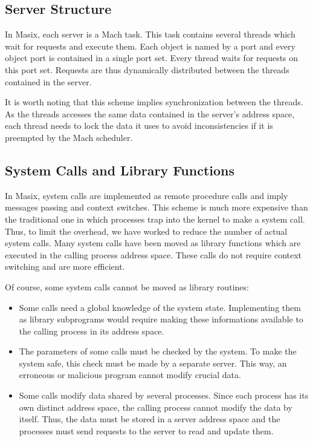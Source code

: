 \subsection {Server Structure}

	In Masix, each server is a Mach task. This task contains several
threads which wait for requests and execute them.
Each object is named by a port and every object
port is contained in a single port set. Every thread waits for requests on
this port set. Requests are thus dynamically distributed between the
threads contained in the server.

	It is worth noting that this scheme implies synchronization between
the threads. As the threads accesses the same data contained in the server's
address space, each thread needs to lock the data it uses to avoid
inconsistencies if it is preempted by the Mach scheduler.

\subsection {System Calls and Library Functions}

	In Masix, system calls are implemented as remote procedure calls and
imply messages passing and context switches. This scheme is much more expensive
than the traditional one in which processes trap into the kernel to make a
system call. Thus, to limit the overhead, we have worked to reduce the number
of actual system calls. Many system calls have been moved as library functions
which are executed in the calling process address space. These calls do not
require context switching and are more efficient.

	Of course, some system calls cannot be moved as library routines:
\begin {itemize}
\item Some calls need a global knowledge of the system state. Implementing
them as library subprograms would require making these informations available
to the calling process in its address space.
\item The parameters of some calls must be checked by the
system. To make the system safe, this check must be made by a separate
server. This way, an erroneous or malicious program cannot modify crucial
data.
\item Some calls modify data shared by several processes. Since each process
has its own distinct address space, the calling process cannot modify the
data by itself. Thus, the data must be stored in a server address space and the
processes must send requests to the server to read and update them.
\end {itemize}

